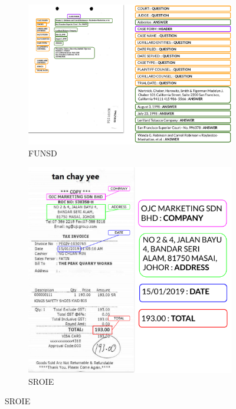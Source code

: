 \begin{figure}
  \centering
  \small
  \begin{subfigure}[b]{0.6\textwidth}
    \includegraphics[width=\textwidth]{images/chapter4/funsd_sample_and_output.pdf}
    \caption{FUNSD}
  \end{subfigure}
  \begin{subfigure}[b]{0.4\textwidth}
    \includegraphics[width=\textwidth]{images/chapter4/sroie_sample_and_output.pdf}
    \caption{SROIE}
  \end{subfigure}

\end{figure}
